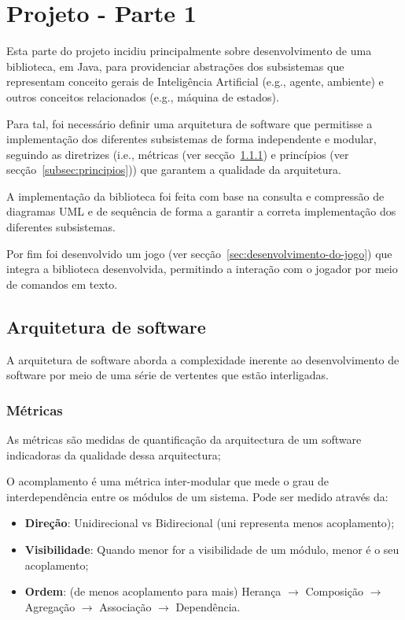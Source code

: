 \chapter{Projeto - Parte 1} \label{ch:projeto-parte1}

Esta parte do projeto incidiu principalmente sobre desenvolvimento de uma biblioteca, em Java, para providenciar abstrações dos subsistemas que representam conceito gerais de Inteligência Artificial (e.g., agente, ambiente) e outros conceitos relacionados (e.g., máquina de estados).

Para tal, foi necessário definir uma arquitetura de software que permitisse a implementação dos diferentes subsistemas de forma independente e modular, seguindo as diretrizes (i.e., métricas (ver secção~\ref{subsec:metricas}) e princípios (ver secção~\ref{subsec:principios})) que garantem a qualidade da arquitetura.

A implementação da biblioteca foi feita com base na consulta e compressão de diagramas UML e de sequência de forma a garantir a correta implementação dos diferentes subsistemas.

Por fim foi desenvolvido um jogo (ver secção~\ref{sec:desenvolvimento-do-jogo}) que integra a biblioteca desenvolvida, permitindo a interação com o jogador por meio de comandos em texto.


\section{Arquitetura de software}\label{sec:arquitetura-de-software}

A arquitetura de software aborda a complexidade inerente ao desenvolvimento de software por meio de uma série de vertentes que estão interligadas.

\subsection{Métricas}\label{subsec:metricas}

As métricas são medidas de quantificação da arquitectura de um software indicadoras da qualidade dessa arquitectura;

O acomplamento é uma métrica inter-modular que mede o grau de interdependência entre os módulos de um sistema. Pode ser medido através da:
\begin{itemize}
    \item \textbf{Direção}: Unidirecional vs Bidirecional (uni representa menos acoplamento);
    \item \textbf{Visibilidade}: Quando menor for a visibilidade de um módulo, menor é o seu acoplamento;
    \item \textbf{Ordem}: (de menos acoplamento para mais) Herança $\rightarrow$ Composição $\rightarrow$ Agregação $\rightarrow$ Associação $\rightarrow$ Dependência.
\end{itemize}

